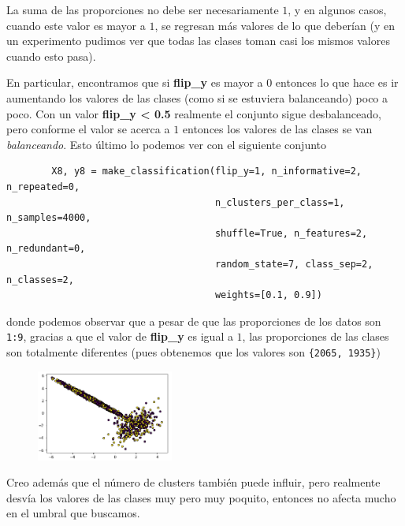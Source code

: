 \documentclass[letterpaper,11pt]{article}
\begin{document}
\begin{enumerate}
    La suma de las proporciones no debe ser necesariamente $1$, y en algunos 
    casos, cuando este valor es mayor a $1$, se regresan más valores de lo 
    que deberían (y en un experimento pudimos ver que todas las clases toman 
    casi los mismos valores cuando esto pasa).

    En particular, encontramos que si \textbf{flip\_y} es mayor a $0$ entonces 
    lo que hace es ir aumentando los valores de las clases (como si se estuviera 
    balanceando) poco a poco. Con un valor \textbf{flip\_y < 0.5} realmente el 
    conjunto sigue desbalanceado, pero conforme el valor se acerca a $1$ entonces
    los valores de las clases se van \textit{balanceando}. Esto último lo podemos 
    ver con el siguiente conjunto
    \begin{verbatim}
        X8, y8 = make_classification(flip_y=1, n_informative=2, n_repeated=0,
                                     n_clusters_per_class=1, n_samples=4000, 
                                     shuffle=True, n_features=2, n_redundant=0, 
                                     random_state=7, class_sep=2, n_classes=2, 
                                     weights=[0.1, 0.9])
    \end{verbatim}

    donde podemos observar que a pesar de que las proporciones de los datos son 
    \texttt{1:9}, gracias a que el valor de \textbf{flip\_y} es igual a $1$, las 
    proporciones de las clases son totalmente diferentes (pues obtenemos que 
    los valores son \texttt{\{2065, 1935\}})
    \begin{figure}[ht]
        \centering
        \includegraphics[width=0.4\textwidth]{imagenes/experimento9.png}
    \end{figure}

    \newpage
    Creo además que el número de clusters también puede influir, pero realmente 
    desvía los valores de las clases muy pero muy poquito, entonces no afecta 
    mucho en el umbral que buscamos.



\end{enumerate}
\end{document}
